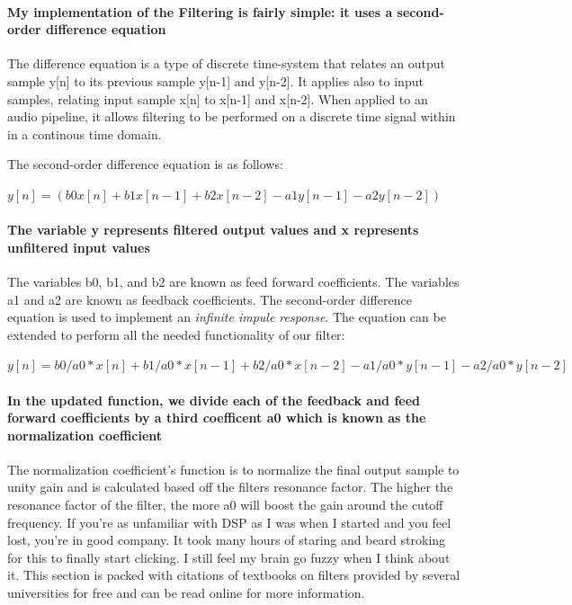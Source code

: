 \documentclass[acmlarge,screen]{acmart}
\begin{document}
	\paragraph{My implementation of the Filtering is fairly simple: it uses a second-order difference equation} The difference equation is a type of discrete time-system that relates an output sample y[n] to its previous sample y[n-1] and y[n-2]. It applies also to input samples, relating input sample x[n] to x[n-1] and x[n-2]. When applied to an audio pipeline, it allows filtering to be performed on a discrete time signal within in a continous time domain.\cite{stanford_2007} 
	
	The second-order difference equation is as follows: 
	
	\( y[n] = (b0x[n] + b1x[n-1] + b2x[n-2] - a1y[n-1] - a2y[n-2]) \)
	
	\paragraph{The variable y represents filtered output values and x represents unfiltered input values} The variables b0, b1, and b2 are known as feed forward coefficients. The variables a1 and a2 are known as feedback coefficients. The second-order difference equation is used to implement an \textit{infinite impule response}. The equation can be extended to perform all the needed functionality of our filter:
	
	\( y[n] = b0/a0*x[n] + b1/a0*x[n-1] + b2/a0*x[n-2] - a1/a0*y[n-1] - a2/a0*y[n-2] \)
	
	\paragraph{In the updated function, we divide each of the feedback and feed forward coefficients by a third coefficent a0 which is known as the normalization coefficient} The normalization coefficient's function is to normalize the final output sample to unity gain and is calculated based off the filters resonance factor. The higher the resonance factor of the filter, the more a0 will boost the gain around the cutoff frequency. If you're as unfamiliar with DSP as I was when I started and you feel lost, you're in good company. It took many hours of staring and beard stroking for this to finally start clicking. I still feel my brain go fuzzy when I think about it. This section is packed with citations of textbooks on filters provided by several universities for free and can be read online for more information. \cite{lacamera_2020}
	
\end{document}
